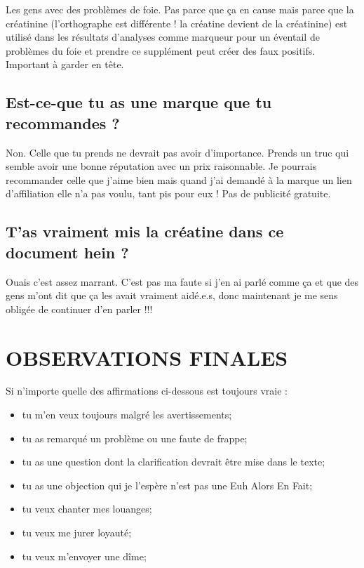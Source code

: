 \documentclass{article}
\begin{document}
Les gens avec des problèmes de foie. Pas parce que ça en cause mais parce que la créatinine (l'orthographe est différente ! la créatine devient de la créatinine) est utilisé dans les résultats d'analyses comme marqueur pour un éventail de problèmes du foie et prendre ce supplément peut créer des faux positifs. Important à garder en tête.

\subsection{Est-ce-que tu as une marque que tu recommandes ?}

Non. Celle que tu prends ne devrait pas avoir d'importance. Prends un truc qui semble avoir une bonne réputation avec un prix raisonnable. Je pourrais recommander celle que j'aime bien mais quand j'ai demandé à la marque un lien d'affiliation elle n'a pas voulu, tant pis pour eux ! Pas de publicité gratuite. 

\subsection{T'as vraiment mis la créatine dans ce document hein ?}

Ouais c'est assez marrant. C'est pas ma faute si j'en ai parlé comme ça et que des gens m'ont dit que ça les avait vraiment aidé.e.s, donc maintenant je me sens obligée de continuer d'en parler !!!

 

\section{OBSERVATIONS FINALES}

Si n'importe quelle des affirmations ci-dessous est toujours vraie :

\begin{itemize}
\item tu m'en veux toujours malgré les avertissements;

\item tu as remarqué un problème ou une faute de frappe;

\item tu as une question dont la clarification devrait être mise dans le texte;

\item tu as une objection qui je l'espère n'est pas une Euh Alors En Fait;

\item tu veux chanter mes louanges;

\item tu veux me jurer loyauté; 

\item tu veux m'envoyer une dîme;
\end{itemize}
\end{document}
